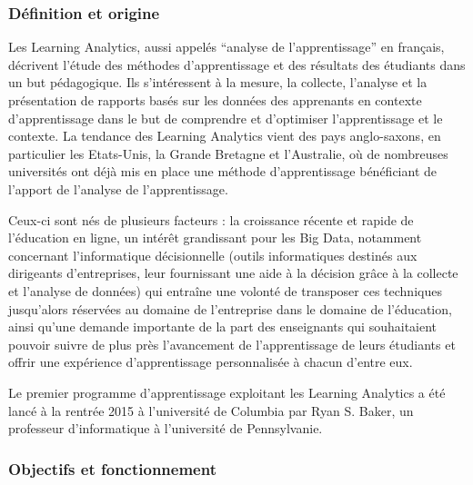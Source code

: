         \subsubsection{Définition et origine}
            
            Les Learning Analytics, aussi appelés \enquote{analyse de l’apprentissage} en français, décrivent l’étude des méthodes d’apprentissage et des résultats des étudiants dans un but pédagogique. Ils s’intéressent à  la mesure, la collecte, l’analyse et la présentation de rapports basés sur les données des apprenants en contexte d’apprentissage dans le but de comprendre et d’optimiser l’apprentissage et le contexte. La tendance des Learning Analytics vient des pays anglo-saxons, en particulier les Etats-Unis, la Grande Bretagne et l’Australie, où de nombreuses universités ont déjà mis en place une méthode d’apprentissage bénéficiant de l’apport de  l’analyse de l’apprentissage.

            Ceux-ci sont nés de plusieurs facteurs : la croissance récente et rapide de l’éducation en ligne, un intérêt grandissant pour les Big Data, notamment concernant l’informatique décisionnelle (outils informatiques destinés aux dirigeants d’entreprises, leur fournissant une aide à la décision grâce à la collecte et l’analyse de données) qui entraîne une volonté de transposer ces techniques jusqu’alors réservées au domaine de l’entreprise dans le domaine de l’éducation, ainsi qu’une demande importante de la part des enseignants qui souhaitaient pouvoir suivre de plus près l’avancement de l’apprentissage de leurs étudiants et offrir une expérience d’apprentissage personnalisée à chacun d’entre eux. 
       
            Le premier programme d’apprentissage exploitant les Learning Analytics a été lancé à la rentrée 2015 à l’université de Columbia par Ryan S. Baker, un professeur d’informatique à l’université de Pennsylvanie.
       
       \subsubsection{Objectifs et fonctionnement}
    
